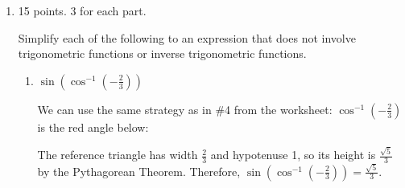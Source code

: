 \documentclass{article}
\begin{document}
\begin{enumerate}

\item 

\begin{grading}
    15 points. 3 for each part. 
\end{grading}

  Simplify each of the following to an expression that does not
  involve trigonometric functions or inverse trigonometric functions.

  \begin{enumerate}
  \item
    \begin{problem}[\vfill]
      $\sin\!\left(\cos^{-1}\!\left( - \frac{2}{3}\right)\right)$
    \end{problem}

    \begin{solution}
      We can use the same strategy as in {{\#4}} from the worksheet:
      $\cos^{-1}\left( - \frac{2}{3}\right)$ is the red angle below:
      \begin{center}
        \begin{tikzangle}[angle=rad(acos(-2/3)), func=cos,
          functick=$-\frac{2}{3}$, triangle=true]            
        \end{tikzangle}
      \end{center}
      The reference triangle has width $\frac{2}{3}$ and hypotenuse 1, so
      its height is $\frac{\sqrt{5}}{3}$ by the Pythagorean Theorem.
      Therefore, $\displaystyle
      \sin\left(\cos^{-1}\left(-\frac{2}{3}\right)\right) =
      \boxed{\frac{\sqrt{5}}{3}}$.


\end{solution}
\end{enumerate}
\end{enumerate}
\end{document}
